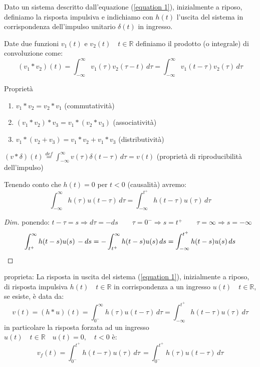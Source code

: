 \begin{definizione}
	Dato un sistema descritto dall'equazione (\ref{equation 1}), inizialmente a riposo, definiamo la risposta impulsiva e indichiamo con $h(t)$ l'uscita del sistema in corrispondenza dell'impulso unitario $\delta (t)$ in ingresso.
\end{definizione}

\begin{definizione}
	Date due funzioni $v_1(t)$ e $v_2(t) \quad t\in\mathbb{R} $ definiamo il prodotto (o integrale) di convoluzione come:
	\begin{equation*}
		(v_1 * v_2)(t) 
		= \int_{-\infty}^{\infty}v_1(\tau)v_2(\tau - t)\,d\tau 
		= \int_{-\infty}^{\infty}v_1(t - \tau)v_2(\tau )\,d\tau
	\end{equation*}
	
	Proprietà
	\begin{enumerate}
		\item $v_1 * v_2 = v_2 * v_1 $ (commutatività)
		\item $(v_1 * v_2) * v_3  = v_1 * (v_2 * v_3) $ (associatività)
		\item $v_1 * (v_2 + v_3)  = v_1 * v_2 + v_1 * v_3$ (distributività)
	\end{enumerate}

\begin{osservazione}
	$(v *\delta)(t)\overset{def}{=} \int_{-\infty}^{\infty}v(\tau)\delta(t - \tau)\,d\tau = v(t)$ (proprietà di riproducibilità dell'impulso)
\end{osservazione}
\end{definizione}
Tenendo conto che $h(t)=0$ per $t<0$ (causalità) avremo:
\begin{equation*}
	\int_{-\infty}^{\infty}h(\tau)u(t - \tau)\,d\tau 
	= \int_{-\infty}^{t^+}h(t - \tau)u(\tau)\,d\tau
\end{equation*}
\begin{proof}[Dim]
ponendo:  $t-\tau = s \Rightarrow d\tau = - ds 
\qquad \tau = 0^-  \Rightarrow s = t^+ 
\qquad \tau=\infty \Rightarrow s = -\infty$
\[
\int_{t^+}^{\infty}h(t-s)u(s)\,-ds 
=-\int_{t^+}^{\infty}h(t-s)u(s)\,ds
=\int_{-\infty}^{t^+}h(t-s)u(s)\,ds
\qedhere
\]
\end{proof}

proprieta:
La risposta in uscita del sistema (\ref{equation 1}), inizialmente a riposo, di risposta impulsiva $h(t)\quad t\in\mathbb{R}$ in corrispondenza a un ingresso $u(t)\quad t\in\mathbb{R}$, se esiste, è data da:
\[
v(t)=(h*u)(t) = \int_{0^-}^{\infty}h(\tau)u(t - \tau)\,d\tau
= \int_{-\infty}^{t^+}h(t - \tau)u(\tau)\,d\tau
\]
in particolare la risposta forzata ad un ingresso $u(t)\quad t\in\mathbb{R} \quad u(t)=0 ,\quad t<0$ è:
\[
v\!_f(t) =
\int_{0^-}^{t^+}h(t - \tau)u(\tau)\,d\tau 
 \,= 
\int_{0^-}^{t^+}h(\tau)u(t - \tau)\,d\tau 
\]

